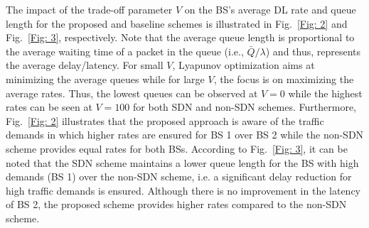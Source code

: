 \documentclass[conference]{IEEEtran}
\begin{document}
The impact of the trade-off parameter $V$ on the BS's average DL rate and queue length for the proposed and baseline schemes is illustrated in Fig.~\ref{Fig: 2} and  Fig.~\ref{Fig: 3}, respectively. Note that the average queue length is proportional to the average waiting time of a packet in the queue (i.e., $\bar{Q}/\lambda$) and thus, represents the average delay/latency. For small $V $, Lyapunov optimization aims at minimizing the average queues while for large $V$, the focus is on maximizing the average rates. Thus, the lowest queues can be observed at $V=0$  while the highest rates can be seen at $V=100$ for both SDN and non-SDN schemes. Furthermore, Fig.~\ref{Fig: 2} illustrates that the proposed approach is aware of the traffic demands in which higher rates are ensured for BS 1 over BS 2 while the non-SDN scheme provides equal rates for both BSs. According to Fig.~\ref{Fig: 3}, it can be noted that the SDN scheme maintains a lower queue length for the BS with high demands (BS 1) over the non-SDN scheme, i.e. a significant delay reduction for high traffic demands is ensured. Although there is no improvement in the latency of BS 2, the proposed scheme provides higher rates compared to the non-SDN scheme.

%
%

%
%

\end{document}
